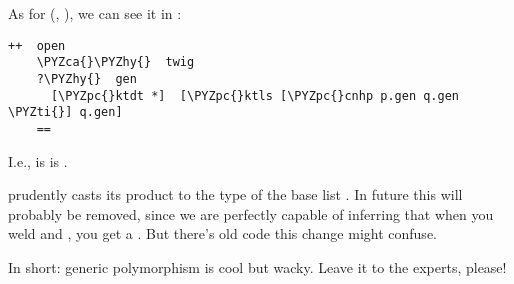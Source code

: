 As for  (, ), we can see it in :

\begin{framed_shaded}
\begin{Verbatim}[fontsize=\relsize{-2.5},fontseries=b,commandchars=\\\{\}]
  ++  open
    \PYZca{}\PYZhy{}  twig
    ?\PYZhy{}  gen
      [\PYZpc{}ktdt *]  [\PYZpc{}ktls [\PYZpc{}cnhp p.gen q.gen \PYZti{}] q.gen]
    ==
\end{Verbatim}
\end{framed_shaded}
I.e.,  is  is .

 prudently casts its product to the type of the base list
.  In future this \kode{\ket +}  will probably be removed, since we are
perfectly capable of inferring that when you weld  and
, you get a .  But there's old code this
change might confuse.

In short: generic polymorphism is cool but wacky.  Leave it to
the experts, please!